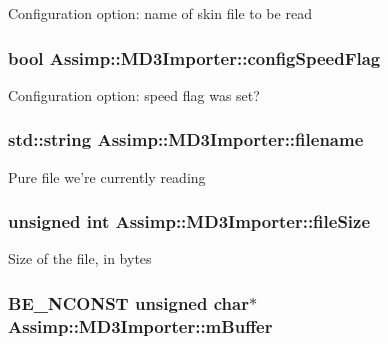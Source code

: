 Configuration option\+: name of skin file to be read \hypertarget{class_assimp_1_1_m_d3_importer_ad0656bbdaea0d931f40194ed7e5f4b88}{
\subsubsection[{config\+Speed\+Flag}]{\setlength{\rightskip}{0pt plus 5cm}bool Assimp\+::\+M\+D3\+Importer\+::config\+Speed\+Flag\hspace{0.3cm}{\ttfamily [protected]}}}\label{class_assimp_1_1_m_d3_importer_ad0656bbdaea0d931f40194ed7e5f4b88}
Configuration option\+: speed flag was set? \hypertarget{class_assimp_1_1_m_d3_importer_ae5f9670bf65c0e47bbc45d1700be7c90}{
\subsubsection[{filename}]{\setlength{\rightskip}{0pt plus 5cm}std\+::string Assimp\+::\+M\+D3\+Importer\+::filename\hspace{0.3cm}{\ttfamily [protected]}}}\label{class_assimp_1_1_m_d3_importer_ae5f9670bf65c0e47bbc45d1700be7c90}
Pure file we're currently reading \hypertarget{class_assimp_1_1_m_d3_importer_a942ddee51c3a6d8027f90155119f6a7f}{
\subsubsection[{file\+Size}]{\setlength{\rightskip}{0pt plus 5cm}unsigned int Assimp\+::\+M\+D3\+Importer\+::file\+Size\hspace{0.3cm}{\ttfamily [protected]}}}\label{class_assimp_1_1_m_d3_importer_a942ddee51c3a6d8027f90155119f6a7f}
Size of the file, in bytes \hypertarget{class_assimp_1_1_m_d3_importer_abce81bd08da2cd056925f136a66740c2}{
\subsubsection[{m\+Buffer}]{\setlength{\rightskip}{0pt plus 5cm}B\+E\+\_\+\+N\+C\+O\+N\+S\+T unsigned char$\ast$ Assimp\+::\+M\+D3\+Importer\+::m\+Buffer\hspace{0.3cm}{\ttfamily [protected]}}}\label{class_assimp_1_1_m_d3_importer_abce81bd08da2cd056925f136a66740c2}
